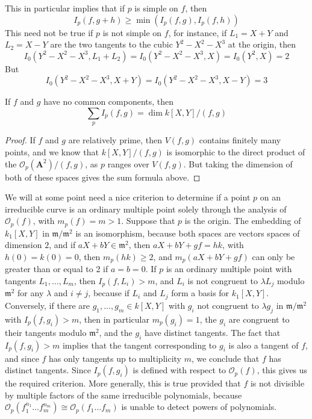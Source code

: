 This in particular implies that if $p$ is simple on $f$, then
%
\[ I_p(f,g + h) \geq \min(I_p(f,g), I_p(f,h)) \]
%
This need not be true if $p$ is not simple on $f$, for instance, if $L_1 = X + Y$ and $L_2 = X - Y$ are the two tangents to the cubic $Y^2 - X^2 - X^3$ at the origin, then
%
\[ I_0(Y^2 - X^2 - X^3, L_1 + L_2) = I_0(Y^2 - X^2 - X^3, X) = I_0(Y^2,X) = 2 \]
%
But
%
\[ I_0(Y^2 - X^2 - X^3, X + Y) = I_0(Y^2 - X^2 - X^3, X - Y) = 3 \]

\begin{theorem}
    If $f$ and $g$ have no common components, then
    \[ \sum_p I_p(f,g) = \dim k[X,Y]/(f,g) \]
\end{theorem}
\begin{proof}
    If $f$ and $g$ are relatively prime, then $V(f,g)$ contains finitely many points, and we know that $k[X,Y]/(f,g)$ is isomorphic to the direct product of the $\mathcal{O}_p(\mathbf{A}^2)/(f,g)$, as $p$ ranges over $V(f,g)$. But taking the dimension of both of these spaces gives the sum formula above.
\end{proof}

We will at some point need a nice criterion to determine if a point $p$ on an irreducible curve is an ordinary multiple point solely through the analysis of $\mathcal{O}_p(f)$, with $m_p(f) = m > 1$. Suppose that $p$ is the origin. The embedding of $k_1[X,Y]$ in $\mathfrak{m}/\mathfrak{m}^2$ is an isomorphism, because both spaces are vectors spaces of dimension $2$, and if $aX + bY \in \mathfrak{m}^2$, then $aX + bY + gf = hk$, with $h(0) = k(0) = 0$, then $m_p(hk) \geq 2$, and $m_p(aX + bY + gf)$ can only be greater than or equal to 2 if $a = b = 0$. If $p$ is an ordinary multiple point with tangents $L_1, \dots, L_m$, then $I_p(f,L_i) > m$, and $L_i$ is not congruent to $\lambda L_j$ modulo $\mathfrak{m}^2$ for any $\lambda$ and $i \neq j$, because if $L_i$ and $L_j$ form a basis for $k_1[X,Y]$. Conversely, if there are $g_1, \dots, g_m \in k[X,Y]$ with $g_i$ not congruent to $\lambda g_j$ in $\mathfrak{m}/\mathfrak{m}^2$ with $I_p(f,g_i) > m$, then in particular $m_p(g_i) = 1$, the $g_i$ are congruent to their tangents modulo $\mathfrak{m}^2$, and the $g_i$ have distinct tangents. The fact that $I_p(f,g_i) > m$ implies that the tangent corresponding to $g_i$ is also a tangent of $f$, and since $f$ has only tangents up to multiplicity $m$, we conclude that $f$ has distinct tangents. Since $I_p(f,g_i)$ is defined with respect to $\mathcal{O}_p(f)$, this gives us the required criterion. More generally, this is true provided that $f$ is not divisible by multiple factors of the same irreducible polynomials, because $\mathcal{O}_p(f_1^{n_1} \dots f_m^{n_m}) \cong \mathcal{O}_p(f_1 \dots f_m)$ is unable to detect powers of polynomials.





